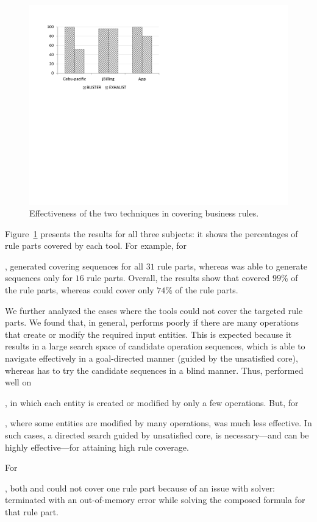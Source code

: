\begin{figure}[t]
\centering
\includegraphics[width=0.65\columnwidth, clip, trim = 18mm 120mm 140mm
  18mm]{figs/Study-1.pdf}
\vspace*{-10pt}
\caption{Effectiveness of the two techniques in covering business rules.}
\label{fig:effectiveness}
\end{figure}

Figure~\ref{fig:effectiveness} presents the results for all three subjects: it
shows the percentages of rule parts covered by each tool. For example, for
\subject{Cebu-pacific}, \tool{} generated covering sequences for all $31$ rule
parts, whereas \exhaust{} was able to generate sequences only for $16$ rule
parts. Overall, the results show that \tool{} covered $99$\% of the rule parts,
whereas \exhaust{} could cover only $74$\% of the rule parts.

We further analyzed the cases where the tools could not cover the targeted rule
parts. We found that, in general, \exhaust{} performs poorly if there are many
operations that create or modify the required input entities. This is expected
because it results in a large search space of candidate operation sequences,
which \tool{} is able to navigate effectively in a goal-directed manner (guided
by the unsatisfied core), whereas \exhaust{} has to try the candidate sequences
in a blind manner. Thus, \exhaust{} performed well on \subject{jBilling}, in
which each entity is created or modified by only a few operations. But, for
\subject{Cebu-pacific}, where some entities are modified by many operations,
\exhaust{} was much less effective. In such cases, a directed search guided by
unsatisfied core, is necessary---and can be highly effective---for attaining
high rule coverage.

For \subject{jBilling}, both \tool{} and \exhaust{} could not cover one rule
part because of an issue with \choco{} solver: \choco{} terminated with an
out-of-memory error while solving the composed formula for that rule part.


